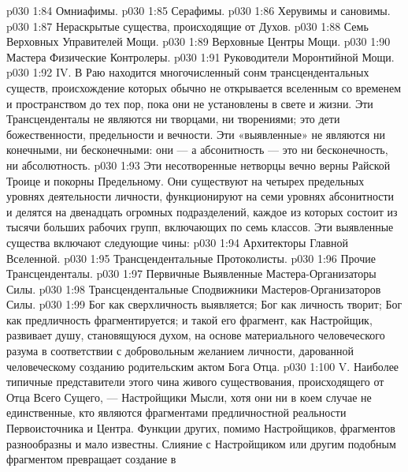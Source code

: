 \vs p030 1:84 \bibnobreakspace Омниафимы.
\vs p030 1:85 \bibnobreakspace Серафимы.
\vs p030 1:86 \bibnobreakspace Херувимы и сановимы.
\vs p030 1:87 \bibnobreakspace Нераскрытые существа, происходящие от Духов.
\vs p030 1:88 \bibnobreakspace Семь Верховных Управителей Мощи.
\vs p030 1:89 \bibnobreakspace Верховные Центры Мощи.
\vs p030 1:90 \bibnobreakspace Мастера Физические Контролеры.
\vs p030 1:91 \bibnobreakspace Руководители Моронтийной Мощи.
\vs p030 1:92 \pc IV.  В Раю находится многочисленный сонм трансцендентальных существ, происхождение которых обычно не открывается вселенным со временем и пространством до тех пор, пока они не установлены в свете и жизни. Эти Трансценденталы не являются ни творцами, ни творениями; это  дети божественности, предельности и вечности. Эти «выявленные» не являются ни конечными, ни бесконечными: они ---  а абсонитность --- это ни бесконечность, ни абсолютность.
\vs p030 1:93 Эти несотворенные нетворцы вечно верны Райской Троице и покорны Предельному. Они существуют на четырех предельных уровнях деятельности личности, функционируют на семи уровнях абсонитности и делятся на двенадцать огромных подразделений, каждое из которых состоит из тысячи больших рабочих групп, включающих по семь классов. Эти выявленные существа включают следующие чины:
\vs p030 1:94 \bibnobreakspace Архитекторы Главной Вселенной.
\vs p030 1:95 \bibnobreakspace Трансцендентальные Протоколисты.
\vs p030 1:96 \bibnobreakspace Прочие Трансценденталы.
\vs p030 1:97 \bibnobreakspace Первичные Выявленные Мастера\hyp{}Организаторы Силы.
\vs p030 1:98 \bibnobreakspace Трансцендентальные Сподвижники Мастеров\hyp{}Организаторов Силы.
\vs p030 1:99 \pc Бог как сверхличность выявляется; Бог как личность творит; Бог как предличность фрагментируется; и такой его фрагмент, как Настройщик, развивает душу, становящуюся духом, на основе материального человеческого разума в соответствии с добровольным желанием личности, дарованной человеческому созданию родительским актом Бога Отца.
\vs p030 1:100 \pc V.  Наиболее типичные представители этого чина живого существования, происходящего от Отца Всего Сущего, --- Настройщики Мысли, хотя они ни в коем случае не единственные, кто являются фрагментами предличностной реальности Первоисточника и Центра. Функции других, помимо Настройщиков, фрагментов разнообразны и мало известны. Слияние с Настройщиком или другим подобным фрагментом превращает создание в 
